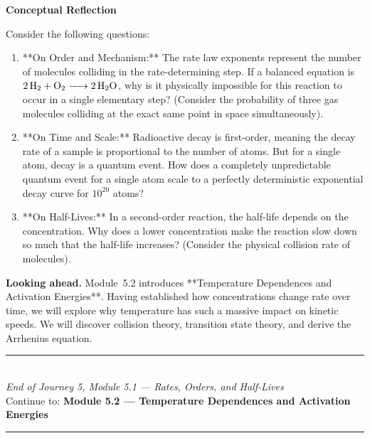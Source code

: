 \documentclass[12pt, a4paper]{book}
\begin{document}
\begin{reflectionbox}
\textbf{Conceptual Reflection}

Consider the following questions:
\begin{enumerate}
  \item **On Order and Mechanism:** The rate law exponents represent the number of molecules colliding in the rate-determining step. If a balanced equation is $\ce{2 H2 + O2 -> 2 H2O}$, why is it physically impossible for this reaction to occur in a single elementary step? (Consider the probability of three gas molecules colliding at the exact same point in space simultaneously).
  \item **On Time and Scale:** Radioactive decay is first-order, meaning the decay rate of a sample is proportional to the number of atoms. But for a single atom, decay is a quantum event. How does a completely unpredictable quantum event for a single atom scale to a perfectly deterministic exponential decay curve for $10^{20}$ atoms?
  \item **On Half-Lives:** In a second-order reaction, the half-life depends on the concentration. Why does a lower concentration make the reaction slow down so much that the half-life increases? (Consider the physical collision rate of molecules).
\end{enumerate}
\end{reflectionbox}

\medskip
\noindent\textbf{Looking ahead.}
Module~5.2 introduces **Temperature Dependences and Activation Energies**. Having established how concentrations change rate over time, we will explore why temperature has such a massive impact on kinetic speeds. We will discover collision theory, transition state theory, and derive the Arrhenius equation.

\vspace{1.4cm}
\begin{center}
{\color{JourneyColor}\rule{0.5\linewidth}{0.8pt}}\\[6pt]
{\small\color{JourneyColor}\textit{End of Journey 5, Module 5.1 --- Rates, Orders, and Half-Lives}}\\[4pt]
{\small\color{JourneyColor}Continue to: \textbf{Module 5.2 --- Temperature Dependences and Activation Energies}}\\[6pt]
{\color{JourneyColor}\rule{0.5\linewidth}{0.8pt}}
\end{center}
\end{document}
